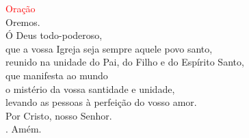 \documentclass{book}
\begin{document}
\begin{flushleft}
    \newpage
    \textcolor{red}{Oração}
    \vspace{.1cm} \\
    Oremos.
    \vspace{.1cm}\\
    Ó Deus todo-poderoso, \\
    que a vossa Igreja seja sempre aquele povo santo, \\
    reunido na unidade do Pai, do Filho e do Espírito Santo, \\
    que manifesta ao mundo \\
    o mistério da vossa santidade e unidade, \\
    levando as pessoas à perfeição do vosso amor. \\
    Por Cristo, nosso Senhor. \\
    {\color{red} \Rbar.} Amém.
    \vspace{.2cm} \\
\end{flushleft}
\end{document}
